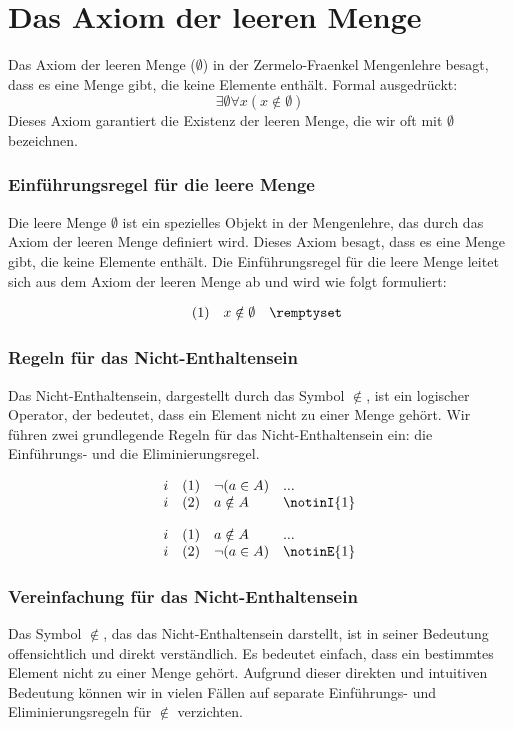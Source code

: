 \documentclass{book}
\theoremstyle{plain}
\theoremstyle{remark}
\theoremstyle{definition}
\begin{document}
\section{Das Axiom der leeren Menge}


Das Axiom der leeren Menge ($\emptyset$) in der Zermelo-Fraenkel Mengenlehre besagt, dass es eine Menge gibt, die keine Elemente enthält. Formal ausgedrückt:
\label{ImpExOFaxLpxNotinORp}
\[
\exists \emptyset \forall x (x \notin \emptyset)
\]
Dieses Axiom garantiert die Existenz der leeren Menge, die wir oft mit $\emptyset$ bezeichnen.

\subsubsection{Einführungsregel für die leere Menge}
\label{rule:remptyset}
Die leere Menge \(\emptyset\) ist ein spezielles Objekt in der Mengenlehre, das durch das Axiom der leeren Menge definiert wird. Dieses Axiom besagt, dass es eine Menge gibt, die keine Elemente enthält. Die Einführungsregel für die leere Menge leitet sich aus dem Axiom der leeren Menge ab und wird wie folgt formuliert:

\[
\begin{array}{llll}
	& (1) & x\notin\emptyset & \remptyset \\
\end{array}
\]

\subsubsection{Regeln für das Nicht-Enthaltensein}
\label{rule:notinE} \label{rule:notinI}
Das Nicht-Enthaltensein, dargestellt durch das Symbol \(\notin\), ist ein logischer Operator, der bedeutet, dass ein Element nicht zu einer Menge gehört. Wir führen zwei grundlegende Regeln für das Nicht-Enthaltensein ein: die Einführungs- und die Eliminierungsregel.

\[
\begin{array}{llll}
	i & (1) & \neg(a\in A) & ... \\
	i & (2) & a \notin A & \notinI{1} \\
\end{array}
\]

\[
\begin{array}{llll}
	i & (1) & a \notin A & ... \\
	i & (2) & \neg(a\in A) & \notinE{1} \\
\end{array}
\]
\subsubsection{Vereinfachung für das Nicht-Enthaltensein}
Das Symbol \(\notin\), das das Nicht-Enthaltensein darstellt, ist in seiner Bedeutung offensichtlich und direkt verständlich. Es bedeutet einfach, dass ein bestimmtes Element nicht zu einer Menge gehört. Aufgrund dieser direkten und intuitiven Bedeutung können wir in vielen Fällen auf separate Einführungs- und Eliminierungsregeln für \(\notin\) verzichten.
\end{document}
